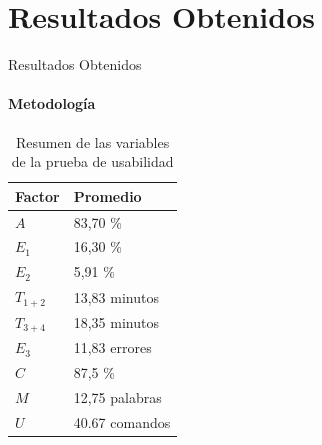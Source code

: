 \section{Resultados Obtenidos}

\begin{frame}{Resultados Obtenidos}
\framesubtitle{Metodolog\'ia}

\begin{table}[H]
\centering
\footnotesize
\caption{Resumen de las variables de la prueba de usabilidad}
\begin{tabular}{|p{1.2cm}|p{2.4cm}|}
\hline
Factor  &   Promedio \\
\hline
$A$  &      83,70 \%     \\
$E_1$ &     16,30 \%  \\
$E_2$  &    5,91  \%  \\
$T_{1+2}$ & 13,83  minutos  \\
$T_{3+4}$ & 18,35  minutos  \\
$E_3$ &     11,83  errores  \\
$C$ &       87,5   \%  \\
$M$ &       12,75  palabras  \\
$U$ &       40.67  comandos  \\
\hline  
\end{tabular}
\label{sec:tabla-resumen-prueba}
\end{table}

\end{frame}


